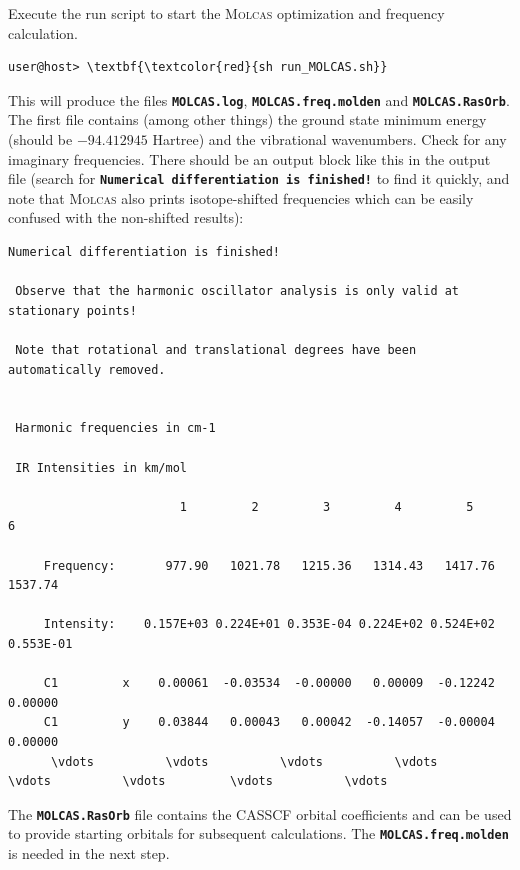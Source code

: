 \documentclass[a4paper,11pt,DIV=15,openany]{scrbook}
\newcommand{\ttt}[1]{\textbf{\texttt{#1}}}
\begin{document}
\normalsize

Execute the run script to start the \textsc{Molcas} optimization and frequency calculation.
\begin{Verbatim}[commandchars=\\\{\}]
user@host> \textbf{\textcolor{red}{sh run_MOLCAS.sh}}
\end{Verbatim}
This will produce the files \ttt{MOLCAS.log}, \ttt{MOLCAS.freq.molden} and \ttt{MOLCAS.RasOrb}. 
The first file contains (among other things) the ground state minimum energy (should be $-94.412945$ Hartree) and the vibrational wavenumbers. 
Check for any imaginary frequencies. 
There should be an output block like this in the output file (search for \ttt{Numerical differentiation is finished!} to find it quickly, and note that \textsc{Molcas} also prints isotope-shifted frequencies which can be easily confused with the non-shifted results):
\begin{oframed}
\footnotesize\begin{Verbatim}[commandchars=\\\{\}]
  Numerical differentiation is finished!

 Observe that the harmonic oscillator analysis is only valid at stationary points!

 Note that rotational and translational degrees have been automatically removed.


 Harmonic frequencies in cm-1

 IR Intensities in km/mol

                        1         2         3         4         5         6
 
     Frequency:       977.90   1021.78   1215.36   1314.43   1417.76   1537.74
 
     Intensity:    0.157E+03 0.224E+01 0.353E-04 0.224E+02 0.524E+02 0.553E-01
 
     C1         x    0.00061  -0.03534  -0.00000   0.00009  -0.12242   0.00000
     C1         y    0.03844   0.00043   0.00042  -0.14057  -0.00004   0.00000
      \vdots          \vdots          \vdots          \vdots         \vdots          \vdots         \vdots          \vdots
\end{Verbatim}
\end{oframed}

\normalsize
The \ttt{MOLCAS.RasOrb} file contains the CASSCF orbital coefficients and can be used to provide starting orbitals for subsequent calculations. 
The \ttt{MOLCAS.freq.molden} is needed in the next step.
\end{document}
